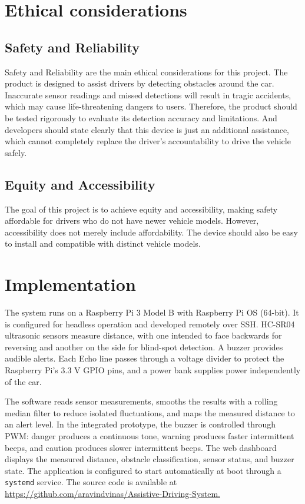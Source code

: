 \documentclass[12pt]{article}
\begin{document}
\clearpage
\section{Ethical considerations}
\subsection{Safety and Reliability}
Safety and Reliability are the main ethical considerations for this project. The product is designed to assist drivers by detecting obstacles around the car. Inaccurate sensor readings and missed detections will result in tragic accidents, which may cause life-threatening dangers to users. Therefore, the product should be tested rigorously to evaluate its detection accuracy and limitations. And developers should state clearly that this device is just an additional assistance, which cannot completely replace the driver's accountability to drive the vehicle safely.

\subsection{Equity and Accessibility}
The goal of this project is to achieve equity and accessibility, making safety affordable for drivers who do not have newer vehicle models. However, accessibility does not merely include affordability. The device should also be easy to install and compatible with distinct vehicle models.

\clearpage
\section{Implementation}
The system runs on a Raspberry Pi 3 Model B with Raspberry Pi OS (64-bit). It is configured for headless operation and developed remotely over SSH. HC-SR04 ultrasonic sensors measure distance, with one intended to face backwards for reversing and another on the side for blind-spot detection. A buzzer provides audible alerts. Each Echo line passes through a voltage divider to protect the Raspberry Pi's 3.3 V GPIO pins, and a power bank supplies power independently of the car.

The software reads sensor measurements, smooths the results with a rolling median filter to reduce isolated fluctuations, and maps the measured distance to an alert level. In the integrated prototype, the buzzer is controlled through PWM: danger produces a continuous tone, warning produces faster intermittent beeps, and caution produces slower intermittent beeps. The web dashboard displays the measured distance, obstacle classification, sensor status, and buzzer state. The application is configured to start automatically at boot through a \texttt{systemd} service. The source code is available at \url{https://github.com/aravindvinas/Assistive-Driving-System.}
\end{document}
